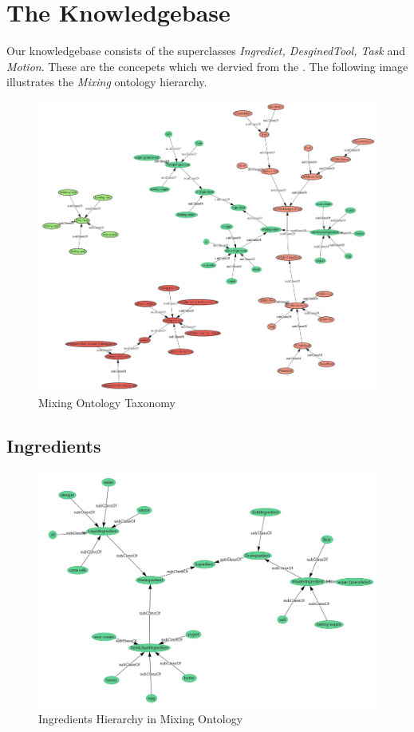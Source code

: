 \section{The Knowledgebase}
Our knowledgebase consists of the superclasses \textit{Ingrediet, DesginedTool, Task} and \textit{Motion}. These are the concepets which we dervied from the . The following image illustrates the \textit{Mixing} ontology hierarchy.
\begin{figure}[H]
    \includegraphics[scale=0.5]{Graphics/classHierarchy/taxonomy.png}
    \centering
    \caption{Mixing Ontology Taxonomy}
\end{figure}

\subsection{Ingredients}

\begin{figure}[H]
    \includegraphics[scale=0.45]{Graphics/classHierarchy/ingredients_hierarchy.png}
    \centering
    \caption{Ingredients Hierarchy in Mixing Ontology}
\end{figure}

